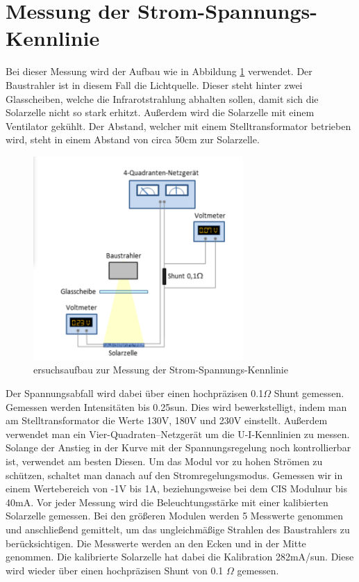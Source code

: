 \section{Messung der Strom-Spannungs-Kennlinie}

Bei dieser Messung wird der Aufbau wie in Abbildung \ref{Versuch2} verwendet. Der Baustrahler ist in diesem Fall die Lichtquelle. Dieser steht hinter zwei 
Glasscheiben, welche die Infrarotstrahlung abhalten sollen, damit sich die Solarzelle nicht so stark erhitzt. Außerdem wird die Solarzelle mit 
einem Ventilator gekühlt. Der Abstand, welcher mit einem Stelltransformator betrieben wird, steht in einem Abstand von circa 50cm zur Solarzelle. 
 
\begin{figure}[ht]
    \captionsetup{justification=centering,margin=2cm}
    \centering
    \includegraphics[width =8cm]{Bilder/Versuchsaufbau2.png}
    \caption{ersuchsaufbau zur Messung der Strom-Spannungs-Kennlinie}
    \label{Versuch2}
\end{figure}

Der Spannungsabfall wird dabei über einen hochpräzisen 0.1$\Omega$ Shunt gemessen. 
Gemessen werden Intensitäten bis 0.25sun. Dies wird bewerkstelligt, indem man am Stelltransformator die Werte 130V, 180V und 230V einstellt.
Außerdem verwendet man ein Vier-Quadraten--Netzgerät um die U-I-Kennlinien zu messen. Solange der Anstieg in der Kurve mit der Spannungsregelung noch kontrollierbar ist,
 verwendet am besten Diesen. Um das Modul vor zu hohen Strömen zu schützen, schaltet man danach auf den Stromregelungsmodus.
Gemessen wir in einem Wertebereich von -1V bis 1A, beziehungsweise bei dem CIS Modulnur bis 40mA.
Vor jeder Messung wird die Beleuchtungsstärke mit einer kalibierten Solarzelle gemessen. Bei den größeren Modulen werden 5 Messwerte genommen 
und anschließend gemittelt, um das ungleichmäßige Strahlen des Baustrahlers zu berücksichtigen. Die Messwerte werden an den Ecken und in der Mitte genommen. 
Die kalibrierte Solarzelle hat dabei die Kalibration 282mA/sun. Diese wird wieder über einen hochpräzisen Shunt von 0.1 $\Omega$ gemessen. 

